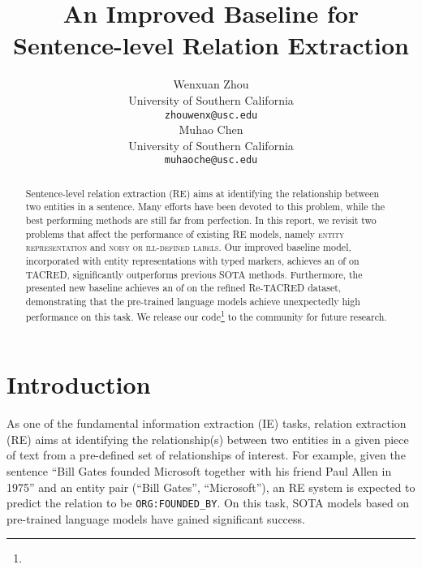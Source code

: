 \documentclass[11pt,a4paper]{article}
\title{An Improved Baseline for Sentence-level Relation Extraction}
\author{Wenxuan Zhou \\
  University of Southern California \\
  \texttt{zhouwenx@usc.edu} \\\And
  Muhao Chen \\
  University of Southern California \\
  \texttt{muhaoche@usc.edu} \\}
\date{}
\begin{document}
\maketitle

\begin{abstract}
Sentence-level relation extraction (RE) aims at identifying the relationship between two entities in a sentence.
Many efforts have been devoted to this problem, while the best performing methods are still far from perfection.
In this report, we revisit two problems that affect the performance of existing RE models, namely \textsc{entity representation} and \textsc{noisy or ill-defined labels}.
Our improved baseline model, incorporated with entity representations with typed markers, achieves an  of  on TACRED, significantly outperforms previous SOTA methods.
Furthermore, the presented new baseline achieves an  of  on the refined Re-TACRED dataset, demonstrating that the pre-trained language models achieve unexpectedly high performance on this task.
We release our code\footnote{} to the community for future research.

\end{abstract}

\section{Introduction}

As one of the fundamental information extraction (IE) tasks,
relation extraction (RE) aims at identifying the relationship(s) between two entities in a given piece of text from a pre-defined set of relationships of interest.
For example, given the sentence ``Bill Gates founded Microsoft together with his friend Paul Allen in 1975'' and an entity pair (``Bill Gates'', ``Microsoft''), an RE system is expected to predict the relation to be \texttt{ORG:FOUNDED\_BY}.
On this task, SOTA models based on pre-trained language models \cite{devlin-etal-2019-bert} have gained significant success. 
\end{document}
